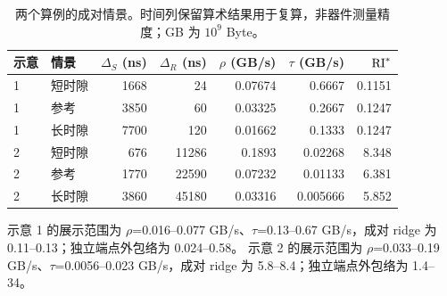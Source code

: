 \begin{table}[htbp]\centering\small
\begin{tabular}{@{}llrrrrr@{}}\toprule
示意 & 情景 & $\Delta_S$ (ns) & $\Delta_R$ (ns) & $\rho$ (GB/s) & $\tau$ (GB/s) & $\mathrm{RI}^*$\\\midrule
1 & 短时隙 & 1668 & 24 & 0.07674 & 0.6667 & 0.1151\\
1 & 参考 & 3850 & 60 & 0.03325 & 0.2667 & 0.1247\\
1 & 长时隙 & 7700 & 120 & 0.01662 & 0.1333 & 0.1247\\
\midrule
2 & 短时隙 & 676 & 11286 & 0.1893 & 0.02268 & 8.348\\
2 & 参考 & 1770 & 22590 & 0.07232 & 0.01133 & 6.381\\
2 & 长时隙 & 3860 & 45180 & 0.03316 & 0.005666 & 5.852\\
\bottomrule\end{tabular}
\caption{两个算例的成对情景。时间列保留算术结果用于复算，非器件测量精度；GB 为 $10^9$ Byte。}
\label{tab:examples}\end{table}
示意 1 的展示范围为 $\rho$=0.016--0.077 GB/s、$\tau$=0.13--0.67 GB/s，成对 ridge 为 0.11--0.13；独立端点外包络为 0.024--0.58。
示意 2 的展示范围为 $\rho$=0.033--0.19 GB/s、$\tau$=0.0056--0.023 GB/s，成对 ridge 为 5.8--8.4；独立端点外包络为 1.4--34。

